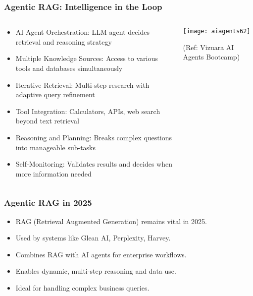 \begin{frame}[fragile]\frametitle{Agentic RAG: Intelligence in the Loop}
\begin{columns}
    \begin{column}[T]{0.6\linewidth}
      \begin{itemize}
		\item AI Agent Orchestration: LLM agent decides retrieval and reasoning strategy
		\item Multiple Knowledge Sources: Access to various tools and databases simultaneously
		\item Iterative Retrieval: Multi-step research with adaptive query refinement
		\item Tool Integration: Calculators, APIs, web search beyond text retrieval
		\item Reasoning and Planning: Breaks complex questions into manageable sub-tasks
		\item Self-Monitoring: Validates results and decides when more information needed
	  \end{itemize}
    \end{column}
    \begin{column}[T]{0.4\linewidth}
		\begin{center}
		\texttt{[image: aiagents62]}
		
		{\tiny (Ref: Vizuara AI Agents Bootcamp)}
		\end{center}	
    \end{column}
  \end{columns}
\end{frame}


\begin{frame}[fragile]\frametitle{Agentic RAG in 2025}
    \begin{itemize}
        \item RAG (Retrieval Augmented Generation) remains vital in 2025.
        \item Used by systems like Glean AI, Perplexity, Harvey.
        \item Combines RAG with AI agents for enterprise workflows.
        \item Enables dynamic, multi-step reasoning and data use.
        \item Ideal for handling complex business queries.
    \end{itemize}
\end{frame}

